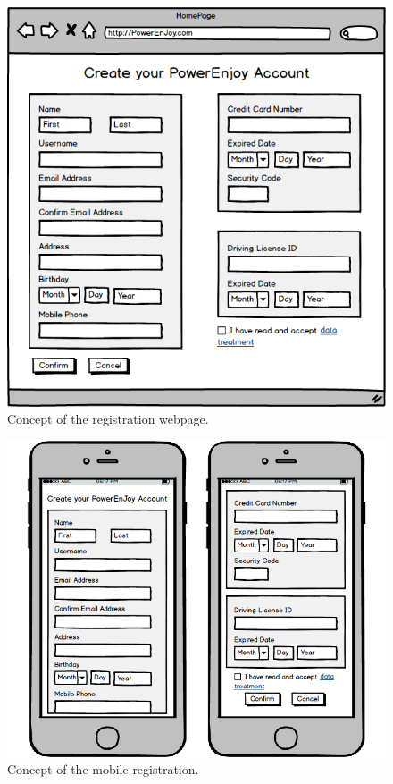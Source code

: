 \begin{figure}[H]
	\centering
	\includegraphics[width=\textwidth]{mockup/WebRegistration.png}
	\caption{Concept of the registration webpage.}
\end{figure}

\begin{figure}[H]
	\centering
	\includegraphics[width=\textwidth]{mockup/MobileRegistration.png}
	\caption{Concept of the mobile registration.}
\end{figure}


